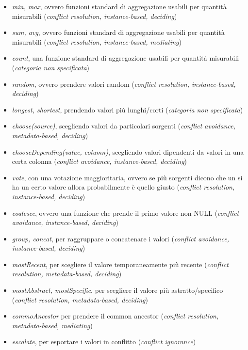 \documentclass[a4paper,12pt, oneside]{book}
\begin{document}
\begin{itemize}
  \item \textit{min, max}, ovvero funzioni standard di
  aggregazione usabili per quantità misurabili (\textit{conflict resolution,
    instance-based, deciding}) 
  \item \textit{sum, avg}, ovvero funzioni standard di
  aggregazione usabili per quantità misurabili (\textit{conflict resolution,
    instance-based, mediating})
   \item \textit{count}, una funzione standard di
  aggregazione usabili per quantità misurabili (\textit{categoria non
    specificata}) 
  \item \textit{random}, ovvero prendere valori random (\textit{conflict
    resolution, instance-based, deciding}) 
  \item \textit{longest, shortest}, prendendo valori più lunghi/corti
  (\textit{categoria non specificata}) 
  \item \textit{choose(source)}, scegliendo valori da particolari sorgenti
  (\textit{conflict avoidance, metadata-based, deciding})
  \item \textit{chooseDepending(value, column)}, scegliendo valori dipendenti da
  valori in una certa colonna (\textit{conflict avoidance, instance-based,
    deciding})  
  \item \textit{vote}, con una votazione maggioritaria, ovvero se più sorgenti
  dicono che un si ha un certo valore allora probabilmente è quello giusto
  (\textit{conflict resolution, instance-based, deciding}) 
  \item \textit{coalesce}, ovvero una funzione che prende il primo valore non
  NULL (\textit{conflict avoidance, instance-based, deciding}) 
  \item \textit{group, concat}, per raggruppare o concatenare i valori
  (\textit{conflict avoidance, instance-based, 
    deciding})  
  \item \textit{mostRecent}, per scegliere il valore temporaneamente più recente
  (\textit{conflict resolution, metadata-based, 
    deciding}) 
  \item \textit{mostAbstract, mostSpecific},  per scegliere
  il valore più astratto/specifico (\textit{conflict resolution, metadata-based,
    deciding}) 
  \item \textit{commoAncestor} per prendere il common ancestor (\textit{conflict
    resolution, metadata-based, mediating}) 
  \item \textit{escalate}, per esportare i valori in conflitto (\textit{conflict
  ignorance})
\end{itemize}
\end{document}
